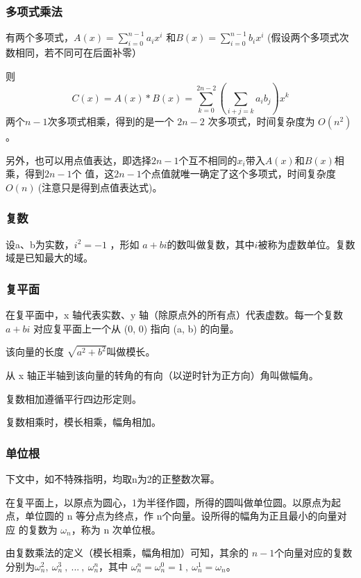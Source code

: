\subsubsection{多项式乘法}
有两个多项式，$A(x)=\sum_{i=0}^{n-1}a_ix^i$ 和$B(x)=\sum_{i=0}^{n-1}b_ix^i$    (假设两个多项式次数相同，若不同可在后面补零）

则
$$
C(x)=A(x)*B(x)=\sum_{k=0}^{2n-2}(\sum_{i+j=k}a_ib_j)x^k
$$
两个$ n - 1$次多项式相乘，得到的是一个 $2n-2$ 次多项式，时间复杂度为 $O(n ^ 2)$。

\begin{note}
另外，也可以用点值表达，即选择$2n-1$个互不相同的$x_i$带入$A(x)$和$B(x)$相乘，得到$2n-1$个
值，这$2n-1$个点值就唯一确定了这个多项式，时间复杂度$O(n)\ $({\heiti 注意只是得到点值表达式})。
\end{note}

\subsubsection{复数}
设a、b为实数，$i ^ 2=-1$ ，形如 $a + bi$的数叫做复数，其中$i$被称为虚数单位。复数域是已知最大的域。


\subsubsection{复平面}
在复平面中，x 轴代表实数、y 轴（除原点外的所有点）代表虚数。每一个复数 $a + bi$ 对应复平面上一个从 (0, 0) 指向 (a, b) 的向量。

该向量的长度 $\sqrt {a ^ 2 + b ^ 2}$叫做{\heiti 模长}。

从 x 轴正半轴到该向量的转角的有向（以逆时针为正方向）角叫做{\heiti 幅角}。

复数相加遵循平行四边形定则。

复数相乘时，模长相乘，幅角相加。

\subsubsection{单位根}
下文中，如不特殊指明，均取{\heiti n为2的正整数次幂}。

在复平面上，以原点为圆心，1为半径作圆，所得的圆叫做{\heiti 单位圆}。以原点为起点，单位圆的 n 等分点为终点，作 n个向量。设所得的{\heiti 幅角为正且最小}的向量对应
的复数为 $\omega_n$，称为 n 次单位根。

由复数乘法的定义（模长相乘，幅角相加）可知，其余的 $n - 1$个向量对应的复数分别为$\omega_n^2,\ \omega_n^3\ ,\ ...\ ,\ \omega_n^n$，其中 
$\omega_n ^ n = \omega_n ^ 0 = 1\ ,\ \omega_n^1=\omega_n$。

